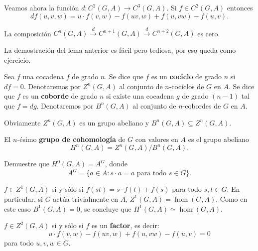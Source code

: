 \begin{example}
	Veamos ahora la función $d\colon C^2(G,A)\to C^3(G,A)$. Si $f\in C^2(G,A)$
	entonces
	\[
	df(u,v,w)=u\cdot f(v,w)-f(uv,w)+f(u,vw)-f(u,v).
	\]
\end{example}

\begin{lemma}
	\label{lemma:dd=0}
	La composición $C^n(G,A)\xrightarrow{d} C^{n+1}(G,A)\xrightarrow{d}
	C^{n+2}(G,A)$ es cero.
\end{lemma}

La demostración del lema anterior es fácil pero tediosa, por eso queda como ejercicio. 

\begin{definition}
	Sea $f$ una cocadena $f$ de grado $n$. Se dice que $f$ es un
	\textbf{cociclo} de grado $n$ si $df=0$. Denotaremos por $Z^n(G,A)$ al
	conjunto de $n$-cociclos de $G$ en $A$. Se dice que $f$ es un
	\textbf{coborde} de grado $n$ si existe una cocadena $g$ de grado $(n-1)$
	tal que $f=dg$. Denotaremos por $B^n(G,A)$ al conjunto de $n$-cobordes de
	$G$ en $A$.
\end{definition}

Obviamente $Z^n(G,A)$ es un grupo abeliano y $B^n(G,A)\subseteq Z^n(G,A)$.

\begin{definition}
	El $n$-ésimo \textbf{grupo de cohomología} de $G$ con valores en $A$
	es el grupo abeliano
	\[
	H^n(G,A)=Z^n(G,A)/B^n(G,A).
	\]
\end{definition}

\begin{exercise}
\label{xca:H0}
	Demuestre que $H^0(G,A)=A^G$, donde 
	\[
	A^G=\{a\in A:s\cdot a=a\text{ para todo $s\in G$}\}. 
	\]
\end{exercise}

\begin{example}
	$f\in Z^1(G,A)$ si y sólo si $f(st)=s\cdot f(t)+f(s)$ para todo $s,t\in G$.
	En particular, si $G$ actúa trivialmente en $A$, $Z^1(G,A)=\hom(G,A)$. Como
	en este caso $B^1(G,A)=0$, se concluye que $H^1(G,A)\simeq\hom(G,A)$. 
\end{example}

\begin{example}
	$f\in Z^2(G,A)$ si y sólo si $f$ es un \textbf{factor}, es decir:
	\begin{equation}
		\label{eq:2cociclo}
		u\cdot f(v,w)-f(uv,w)+f(u,vw)-f(u,v)=0
	\end{equation}
	para todo $u,v,w\in G$.
\end{example}

